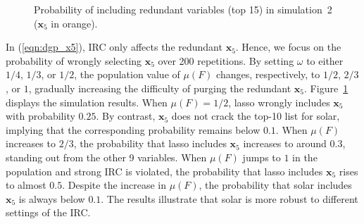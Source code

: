 \documentclass[11pt,authoryear]{elsarticle}
\begin{document}
\begin{figure}
  \centering

  \caption{Probability of including redundant variables (top 15) in simulation~2 ($\mathbf{x}_5$ in orange).}
  \label{fig:solar_ic_type-II}
\end{figure}

In (\ref{eqn:dgp_x5}), IRC only affects the redundant $\mathbf{x}_5$. Hence, we focus on the probability of wrongly selecting $\mathbf{x}_5$ over 200 repetitions. By setting $\omega$ to either $1/4$, $1/3$, or $1/2$, the population value of $\mu \left( F \right)$ changes, respectively, to $1/2$, $2/3$, or $1$, gradually increasing the difficulty of purging the redundant $\mathbf{x}_5$. Figure~\ref{fig:solar_ic_type-II} displays the simulation results. When $\mu \left( F \right) = 1/2$, lasso wrongly includes $\mathbf{x}_5$ with probability $0.25$. By contrast, $\mathbf{x}_5$ does not crack the top-10 list for solar, implying that the corresponding probability remains below $0.1$. When $\mu \left( F \right)$ increases to $2/3$, the probability that lasso includes $\mathbf{x}_5$ increases to around $0.3$, standing out from the other 9 variables. When $\mu \left( F \right)$ jumps to $1$ in the population and strong IRC is violated, the probability that lasso includes $\mathbf{x}_5$ rises to almost $0.5$. Despite the increase in $\mu\left(F\right)$, the probability that solar includes $\mathbf{x}_5$ is always below $0.1$. The results illustrate that solar is more robust to different settings of the IRC.
\end{document}

